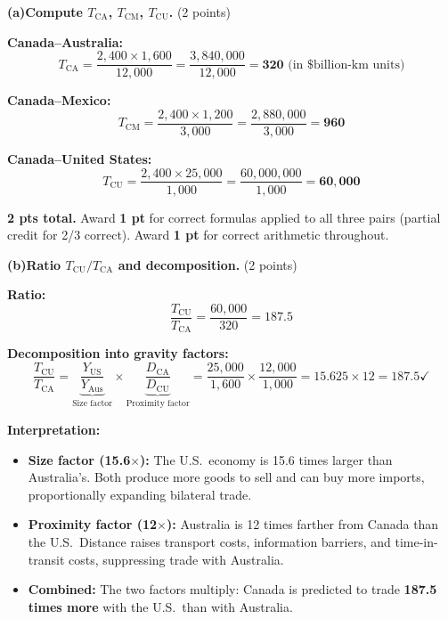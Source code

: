 \documentclass[11pt]{article}
\begin{document}
\noindent\textbf{(a)}\quad\textbf{Compute $T_{\text{CA}}$, $T_{\text{CM}}$, $T_{\text{CU}}$.}
\quad(2 points)

\begin{solutionbox}
\textbf{Canada--Australia:}
\[T_{\text{CA}}
  = \frac{2{,}400 \times 1{,}600}{12{,}000}
  = \frac{3{,}840{,}000}{12{,}000}
  = \mathbf{320}\text{ (in \$billion-km units)}\]

\textbf{Canada--Mexico:}
\[T_{\text{CM}}
  = \frac{2{,}400 \times 1{,}200}{3{,}000}
  = \frac{2{,}880{,}000}{3{,}000}
  = \mathbf{960}\]

\textbf{Canada--United States:}
\[T_{\text{CU}}
  = \frac{2{,}400 \times 25{,}000}{1{,}000}
  = \frac{60{,}000{,}000}{1{,}000}
  = \mathbf{60{,}000}\]
\end{solutionbox}

\begin{rubricbox}
\small
\textbf{2 pts total.} Award \textbf{1 pt} for correct formulas applied to all three
pairs (partial credit for 2/3 correct). Award \textbf{1 pt} for correct arithmetic
throughout.
\end{rubricbox}

\bigskip

\noindent\textbf{(b)}\quad\textbf{Ratio $T_{\text{CU}}/T_{\text{CA}}$ and decomposition.}
\quad(2 points)

\begin{solutionbox}
\textbf{Ratio:}
\[\frac{T_{\text{CU}}}{T_{\text{CA}}} = \frac{60{,}000}{320} = \mathbf{187.5}\]

\textbf{Decomposition into gravity factors:}
\[\frac{T_{\text{CU}}}{T_{\text{CA}}}
  = \underbrace{\frac{Y_{\text{US}}}{Y_{\text{Aus}}}}_{\text{Size factor}}
    \times
    \underbrace{\frac{D_{\text{CA}}}{D_{\text{CU}}}}_{\text{Proximity factor}}
  = \frac{25{,}000}{1{,}600}\times\frac{12{,}000}{1{,}000}
  = 15.625 \times 12
  = \mathbf{187.5\checkmark}\]

\textbf{Interpretation:}
\begin{itemize}[nosep,leftmargin=1.3em]
  \item \textbf{Size factor (15.6$\times$):} The U.S.\ economy is 15.6 times larger
        than Australia's. Both produce more goods to sell and can buy more imports,
        proportionally expanding bilateral trade.
  \item \textbf{Proximity factor (12$\times$):} Australia is 12 times farther from
        Canada than the U.S.\ Distance raises transport costs, information barriers,
        and time-in-transit costs, suppressing trade with Australia.
  \item \textbf{Combined:} The two factors multiply: Canada is predicted to trade
        \textbf{187.5 times more} with the U.S.\ than with Australia.
\end{itemize}
\end{solutionbox}
\end{document}
